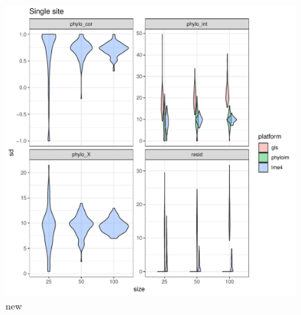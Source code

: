 \documentclass[12pt]{article}
\begin{document}


\begin{center}
\begin{figure}[h]
  \includegraphics[scale=0.8,page=4]{./git_push/plot.Rout.pdf}
  \caption{new}
\end{figure}
\end{center}
\end{document}
